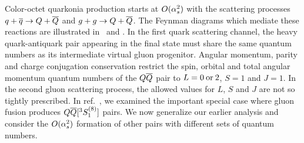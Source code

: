 	Color-octet quarkonia production starts at $O(\alpha_s^2)$ with the 
scattering processes $q + {\overline q} \to Q + {\overline Q}$ and $g+g \to Q + {\overline Q}$.
The Feynman diagrams which mediate these reactions are illustrated in 
\qqbarQQbargraphs\ and \ggQQbargraphs.  In the first quark scattering 
channel, the heavy quark-antiquark pair appearing in the final state 
must share the same quantum numbers as its intermediate virtual gluon 
progenitor.  Angular momentum, parity and charge conjugation conservation 
restrict the spin, orbital and total angular momentum quantum numbers of the 
$Q{\overline Q}$ pair to $L=0 \> {\rm or} \> 2$, $S=1$ and $J=1$.
%
%
In the second gluon scattering process, the allowed values for $L$, $S$ and 
$J$ are not so tightly prescribed.  In ref.~\ChoLeibov, we examined the 
important special case where gluon fusion produces $Q{\overline Q}[ ^3S_1^{(8)}]$ pairs. 
We now generalize our earlier analysis and consider the $O(\alpha_s^2)$ formation 
of other pairs with different sets of quantum numbers.

